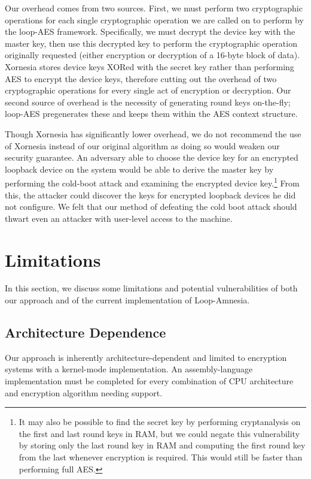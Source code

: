 \documentclass[letterpaper,twocolumn,nonatbib,10pt]{article}
\begin{document}
Our overhead comes from two sources.  First, we must perform two
cryptographic operations for each single cryptographic operation we
are called on to perform by the loop-AES framework.  Specifically, we
must decrypt the device key with the master key, then use this
decrypted key to perform the cryptographic operation originally
requested (either encryption or decryption of a 16-byte block of
data).  Xornesia stores device keys XORed with the secret key rather
than performing AES to encrypt the device keys, therefore cutting out
the overhead of two cryptographic operations for every single act of
encryption or decryption.  Our second source of overhead is the
necessity of generating round keys on-the-fly; loop-AES pregenerates
these and keeps them within the AES context structure.

Though Xornesia has significantly lower overhead, we do not recommend
the use of Xornesia instead of our original algorithm as doing so
would weaken our security guarantee.  An adversary able to choose the
device key for an encrypted loopback device on the system would be
able to derive the master key by performing the cold-boot attack and
examining the encrypted device key.\footnote{It may also be possible
  to find the secret key by performing cryptanalysis on the first and
  last round keys in RAM, but we could negate this vulnerability by
  storing only the last round key in RAM and computing the first round
  key from the last whenever encryption is required.  This would still
  be faster than performing full AES.}  From this, the attacker could
discover the keys for encrypted loopback devices he did not configure.
We felt that our method of defeating the cold boot attack should
thwart even an attacker with user-level access to the machine.

\section{Limitations}

In this section, we discuss some limitations and potential
vulnerabilities of both our approach and of the current implementation
of Loop-Amnesia.

\subsection{Architecture Dependence}
Our approach is inherently architecture-dependent and limited to
encryption systems with a kernel-mode implementation.  An
assembly-language implementation must be completed for every
combination of CPU architecture and encryption algorithm needing
support.
\end{document}
